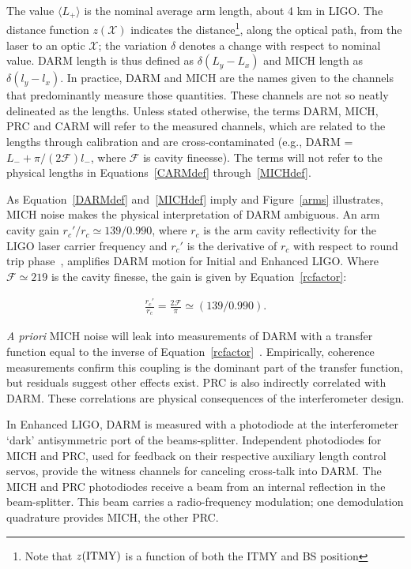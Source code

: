         The value $\langle L_+\rangle$ is the nominal average arm length, about 4 km in LIGO. The distance function $z(\mathcal{X})$ indicates the distance\footnote{Note that $z(\textup{ITMY})$ is a function of both the ITMY and BS position}, along the optical path, from the laser to an optic $\mathcal{X}$; the variation $\delta$ denotes a change with respect to nominal value. DARM length is thus defined as $\delta(L_y - L_x)$ and MICH length as $\delta(l_y - l_x)$. In practice, DARM and MICH are the names given to the channels that predominantly measure those quantities. These channels are not so neatly delineated as the lengths. Unless stated otherwise, the terms DARM, MICH, PRC and CARM will refer to the measured channels, which are related to the lengths through calibration and are cross-contaminated (e.g., DARM = $L_{-} + \pi/(2 \mathcal{F}) l_{-}$, where $\mathcal{F}$ is cavity fineesse). The terms will not refer to the physical lengths in Equations~\ref{CARMdef} through~\ref{MICHdef}. 

        As Equation~\ref{DARMdef} and~\ref{MICHdef} imply and Figure~\ref{arms} illustrates, MICH noise makes the physical interpretation of DARM ambiguous. An arm cavity gain $r_{c}'/r_c \simeq 139/0.990$, where $r_c$ is the arm cavity reflectivity for the LIGO laser carrier frequency and $r_{c}'$ is the derivative of $r_c$ with respect to round trip phase~\cite{ReadoutGWA,BallmerThesis}, amplifies DARM motion for Initial and Enhanced LIGO. Where $\mathcal{F} \simeq 219$ is the cavity finesse, the gain is given by Equation~\ref{rcfactor}:

        \begin{eqnarray}
        \frac{r_{c}'}{r_c} = \frac{2 \mathcal{F}}{\pi} \simeq (139/0.990). \label{rcfactor}
        \end{eqnarray}

        \textit{A priori} MICH noise will leak into measurements of DARM with a transfer function equal to the inverse of Equation~\ref{rcfactor}~\cite{SiggFreq1997}. Empirically, coherence measurements confirm this coupling is the dominant part of the transfer function, but residuals suggest other effects exist. PRC is also indirectly correlated with DARM. These correlations are physical consequences of the interferometer design. 

In Enhanced LIGO, DARM is measured with a photodiode at the interferometer `dark' antisymmetric port of the beams-splitter. Independent photodiodes for MICH and PRC, used for feedback on their respective auxiliary length control servos, provide the witness channels for canceling cross-talk into DARM. The MICH and PRC photodiodes receive a beam from an internal reflection in the beam-splitter. This beam carries a radio-frequency modulation; one demodulation quadrature provides MICH, the other PRC.


